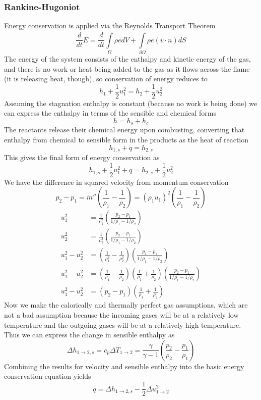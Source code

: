 \documentclass[11pt]{article}
\newcommand{\CenteredBoxed}[1]{\begin{center}\boxed{#1}\end{center}}
\newcommand{\intlim}[2]{\int\limits_{#1}^{#2}}
\begin{document}
\subsubsection{Rankine-Hugoniot}
Energy conservation is applied via the Reynolds Transport Theorem
$$\frac{d}{dt}E = \frac{d}{dt}\intlim{\Omega}{}\rho edV + \intlim{\partial\Omega}{}\rho e(v\cdot n)dS$$
The energy of the system consists of the enthalpy and kinetic energy of the gas, and there is no work or heat being added to the gas as it flows across the flame (it is releasing heat, though), so conservation of energy reduces to
$$h_1 + \frac{1}{2}u_1^2 = h_2 + \frac{1}{2}u_2^2$$
Assuming the stagnation enthalpy is constant (because no work is being done) we can express the enthalpy in terms of the sensible and chemical forms
$$h = h_s + h_c$$
The reactants release their chemical energy upon combusting, converting that enthalpy from chemical to sensible form in the products as the heat of reaction
$$h_{1,s} + q = h_{2,s}$$
This gives the final form of energy conservation as
$$h_{1,s} + \frac{1}{2}u_1^2 + q = h_{2,s} + \frac{1}{2}u_2^2$$
We have the difference in squared velocity from momentum conservation
$$p_2-p_1 = \dot m''\left(\frac{1}{\rho_1}-\frac{1}{\rho_2}\right) = (\rho_1u_1)^2\left(\frac{1}{\rho_1}-\frac{1}{\rho_2}\right) $$
\begin{align*}
u_1^2 &= \frac{1}{\rho_1^2}\left(\frac{p_2-p_1}{1/\rho_1-1/\rho_2}\right)\\
u_2^2 &= \frac{1}{\rho_2^2}\left(\frac{p_2-p_1}{1/\rho_1-1/\rho_2}\right)\\
u_1^2-u_2^2 &= \left(\frac{1}{\rho_1^2}-\frac{1}{\rho_2^2}\right)\left(\frac{p_2-p_1}{1/\rho_1-1/\rho_2}\right)\\
u_1^2-u_2^2 &= \left(\frac{1}{\rho_1}-\frac{1}{\rho_2}\right)\left(\frac{1}{\rho_1}+\frac{1}{\rho_2}\right)\left(\frac{p_2-p_1}{1/\rho_1-1/\rho_2}\right)\\
u_1^2-u_2^2 &= (p_2-p_1)\left(\frac{1}{\rho_1}+\frac{1}{\rho_2}\right)
\end{align*}
Now we make the calorically and thermally perfect gas assumptions, which are not a bad assumption because the incoming gases will be at a relatively low temperature and the outgoing gases will be at a relatively high temperature. Thus we can express the change in sensible enthalpy as
$$\Delta h_{1\to2,s} = c_p\Delta T_{1\to2} = \frac{\gamma}{\gamma-1}\left(\frac{p_2}{\rho_2}-\frac{p_1}{\rho_1}\right)$$
Combining the results for velocity and sensible enthalpy into the basic energy conservation equation yields
$$q = \Delta h_{1\to2,s} - \frac{1}{2}\Delta u_{1\to2}^2$$
\CenteredBoxed{q = \frac{\gamma}{\gamma-1}\left(\frac{p_2}{\rho_2}-\frac{p_1}{\rho_1}\right) - \frac{1}{2}(p_2-p_1)\left(\frac{1}{\rho_1}+\frac{1}{\rho_2}\right)}
\end{document}
